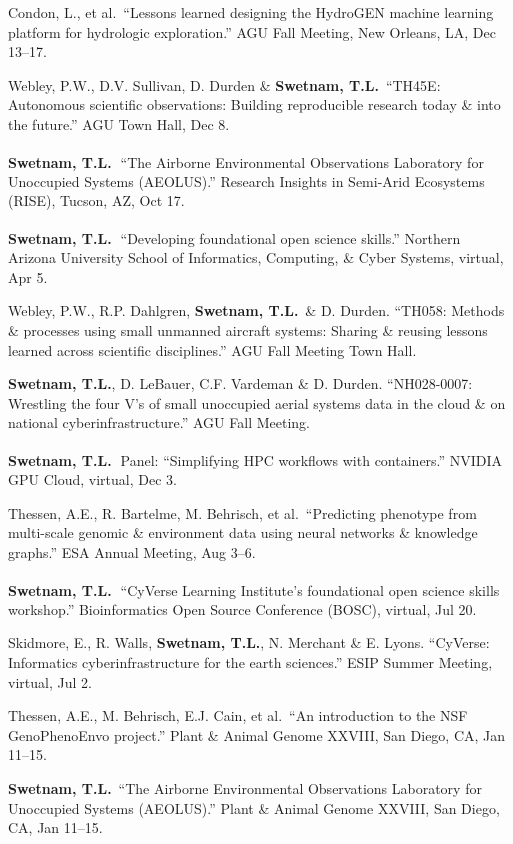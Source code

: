 \documentclass[11pt,letterpaper]{article}
\newcommand{\me}{\textbf{Swetnam, T.L.}}
\newcommand{\inv}{\textsuperscript{\color{cherry}\,\ding{72}}}
\newcommand{\yearhead}[1]{\par\vspace{5pt}{\small\bfseries\color{cherry}#1}\par\vspace{2pt}}
\newenvironment{hanglist}
  {\begin{list}{}{\setlength{\leftmargin}{1.4em}\setlength{\itemindent}{-1.4em}%
     \setlength{\itemsep}{3pt}\setlength{\parsep}{0pt}\setlength{\topsep}{1pt}}}
  {\end{list}}
\begin{document}
\yearhead{2021}
\begin{hanglist}
\item Condon, L., et al.\ ``Lessons learned designing the HydroGEN machine learning platform for hydrologic exploration.'' AGU Fall Meeting, New Orleans, LA, Dec 13--17.
\item Webley, P.W., D.V. Sullivan, D. Durden \& \me\ ``TH45E: Autonomous scientific observations: Building reproducible research today \& into the future.'' AGU Town Hall, Dec 8.
\item \me\inv\ ``The Airborne Environmental Observations Laboratory for Unoccupied Systems (AEOLUS).'' Research Insights in Semi-Arid Ecosystems (RISE), Tucson, AZ, Oct 17.
\item \me\inv\ ``Developing foundational open science skills.'' Northern Arizona University School of Informatics, Computing, \& Cyber Systems, virtual, Apr 5.
\end{hanglist}

\yearhead{2020}
\begin{hanglist}
\item Webley, P.W., R.P. Dahlgren, \me\ \& D. Durden. ``TH058: Methods \& processes using small unmanned aircraft systems: Sharing \& reusing lessons learned across scientific disciplines.'' AGU Fall Meeting Town Hall.
\item \me, D. LeBauer, C.F. Vardeman \& D. Durden. ``NH028-0007: Wrestling the four V's of small unoccupied aerial systems data in the cloud \& on national cyberinfrastructure.'' AGU Fall Meeting.
\item \me\inv\ Panel: ``Simplifying HPC workflows with containers.'' NVIDIA GPU Cloud, virtual, Dec 3.
\item Thessen, A.E., R. Bartelme, M. Behrisch, et al.\ ``Predicting phenotype from multi-scale genomic \& environment data using neural networks \& knowledge graphs.'' ESA Annual Meeting, Aug 3--6.
\item \me\inv\ ``CyVerse Learning Institute's foundational open science skills workshop.'' Bioinformatics Open Source Conference (BOSC), virtual, Jul 20.
\item Skidmore, E., R. Walls, \me, N. Merchant \& E. Lyons. ``CyVerse: Informatics cyberinfrastructure for the earth sciences.'' ESIP Summer Meeting, virtual, Jul 2.
\item Thessen, A.E., M. Behrisch, E.J. Cain, et al.\ ``An introduction to the NSF GenoPhenoEnvo project.'' Plant \& Animal Genome XXVIII, San Diego, CA, Jan 11--15.
\item \me\ ``The Airborne Environmental Observations Laboratory for Unoccupied Systems (AEOLUS).'' Plant \& Animal Genome XXVIII, San Diego, CA, Jan 11--15.
\end{hanglist}
\end{document}
